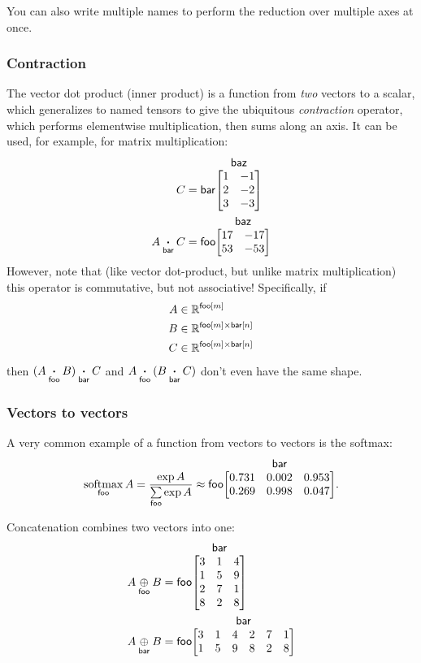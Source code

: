 \documentclass{article}
\makeatletter
\newcommand{\nmatrix}[3]{\name{#1}\begin{array}[b]{@{}c@{}}\name{#2}\\\begin{bmatrix}#3\end{bmatrix}\end{array}}
\makeatother
\begin{document}
You can also write multiple names to perform the reduction over multiple axes at once.

\subsubsection{Contraction}

The vector dot product (inner product) is a function from \emph{two} vectors to a scalar, which generalizes to named tensors to give the ubiquitous \emph{contraction} operator, which performs elementwise multiplication, then sums along an axis. It can be used, for example, for matrix multiplication:
\begin{align*}
C &= \nmatrix{bar}{baz}{
  1 & -1 \\ 2 & -2 \\ 3 & -3
} \\
A \ndot{bar} C &= \nmatrix{foo}{baz}{
  17 & -17 \\
  53 & -53
}
\end{align*}
However, note that (like vector dot-product, but unlike matrix multiplication) this operator is commutative, but not associative! Specifically, if
\begin{align*}
A &\in \mathbb{R}^{\mathsf{foo}[m]} \\
B &\in \mathbb{R}^{\mathsf{foo}[m] \times\mathsf{bar}[n]} \\
C &\in \mathbb{R}^{\mathsf{foo}[m] \times\mathsf{bar}[n]}
\end{align*}
then $(A \mathbin{\mathop{\boldsymbol\cdot}\limits_{\mathsf{foo}}} B) \mathbin{\mathop{\boldsymbol\cdot}\limits_{\mathsf{bar}}} C$ and $A \mathbin{\mathop{\boldsymbol\cdot}\limits_{\mathsf{foo}}} (B \mathbin{\mathop{\boldsymbol\cdot}\limits_{\mathsf{bar}}} C)$ don't even have the same shape.

\subsubsection{Vectors to vectors}

A very common example of a function from vectors to vectors is the softmax:
\begin{equation*}
  \nfun{foo}{softmax} A = \frac{\exp A}{\nsum{foo} \exp A} \approx \nmatrix{foo}{bar}{
    0.731 & 0.002 & 0.953 \\
    0.269 & 0.998 & 0.047
  }.
\end{equation*}

Concatenation combines two vectors into one:
\begin{align*}
  A \ncat{foo} B &= \nmatrix{foo}{bar}{
    3 & 1 & 4 \\
    1 & 5 & 9 \\
    2 & 7 & 1 \\
    8 & 2 & 8
  } \\
  A \ncat{bar} B &= \nmatrix{foo}{bar}{
    3 & 1 & 4 & 2 & 7 & 1 \\
    1 & 5 & 9 & 8 & 2 & 8
  }
\end{align*}
\end{document}
